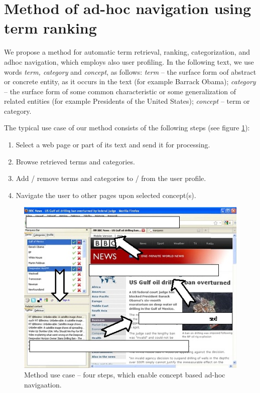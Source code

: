 \documentclass{llncs}%
\begin{document}
\section{Method of ad-hoc navigation using term ranking }

We propose a method for automatic term retrieval, ranking, categorization, and adhoc navigation, which employs also user profiling. In the following text, we use words  \textit{term, category}%
 and \textit{concept}, as follows: 
\textit{term} – the surface form \cite{cucerzan2007large} oof abstract or concrete entity, as it occurs in the text (for example Barrack Obama); \textit{category} – the surface form of some common characteristic or some generalization of related entities (for example Presidents of the United States); \textit{concept} – term or category.  

The typical use case of our method consists of the following steps (see figure \ref{fig1}):%

\begin{enumerate}%
\item Select a web page or part of its text and send it for processing. 
\item Browse retrieved terms and categories. 
\item Add / remove terms and categories to / from the user profile. 
\item Navigate the user to other pages upon selected concept(s). 
\end{enumerate} 

\begin{figure}[ht]%
\centering%
\includegraphics[width =\textwidth]{Images/obr1.jpg}
\caption{Method use case – four steps, which enable concept based ad-hoc navigaation. }%
\label{fig1}%
\end{figure}
\end{document}
